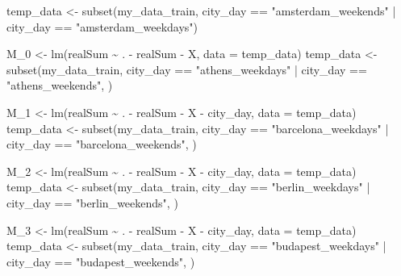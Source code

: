 \documentclass[
]{article}
\newenvironment{Shaded}{\begin{snugshade}}{\end{snugshade}}
\newcommand{\AttributeTok}[1]{\textcolor[rgb]{0.77,0.63,0.00}{#1}}
\newcommand{\FunctionTok}[1]{\textcolor[rgb]{0.00,0.00,0.00}{#1}}
\newcommand{\NormalTok}[1]{#1}
\newcommand{\OtherTok}[1]{\textcolor[rgb]{0.56,0.35,0.01}{#1}}
\newcommand{\SpecialCharTok}[1]{\textcolor[rgb]{0.00,0.00,0.00}{#1}}
\newcommand{\StringTok}[1]{\textcolor[rgb]{0.31,0.60,0.02}{#1}}
\begin{document}
\begin{Shaded}
\begin{Highlighting}[]
\NormalTok{temp\_data }\OtherTok{\textless{}{-}} \FunctionTok{subset}\NormalTok{(my\_data\_train, city\_day }\SpecialCharTok{==} \StringTok{"amsterdam\_weekends"} \SpecialCharTok{|}
\NormalTok{    city\_day }\SpecialCharTok{==} \StringTok{"amsterdam\_weekdays"}\NormalTok{)}

\NormalTok{M\_0 }\OtherTok{\textless{}{-}} \FunctionTok{lm}\NormalTok{(realSum }\SpecialCharTok{\textasciitilde{}}\NormalTok{ . }\SpecialCharTok{{-}}\NormalTok{ realSum }\SpecialCharTok{{-}}\NormalTok{ X, }\AttributeTok{data =}\NormalTok{ temp\_data)}
\NormalTok{temp\_data }\OtherTok{\textless{}{-}} \FunctionTok{subset}\NormalTok{(my\_data\_train, city\_day }\SpecialCharTok{==} \StringTok{"athens\_weekdays"} \SpecialCharTok{|}
\NormalTok{    city\_day }\SpecialCharTok{==} \StringTok{"athens\_weekends"}\NormalTok{, )}

\NormalTok{M\_1 }\OtherTok{\textless{}{-}} \FunctionTok{lm}\NormalTok{(realSum }\SpecialCharTok{\textasciitilde{}}\NormalTok{ . }\SpecialCharTok{{-}}\NormalTok{ realSum }\SpecialCharTok{{-}}\NormalTok{ X }\SpecialCharTok{{-}}\NormalTok{ city\_day, }\AttributeTok{data =}\NormalTok{ temp\_data)}
\NormalTok{temp\_data }\OtherTok{\textless{}{-}} \FunctionTok{subset}\NormalTok{(my\_data\_train, city\_day }\SpecialCharTok{==} \StringTok{"barcelona\_weekdays"} \SpecialCharTok{|}
\NormalTok{    city\_day }\SpecialCharTok{==} \StringTok{"barcelona\_weekends"}\NormalTok{, )}

\NormalTok{M\_2 }\OtherTok{\textless{}{-}} \FunctionTok{lm}\NormalTok{(realSum }\SpecialCharTok{\textasciitilde{}}\NormalTok{ . }\SpecialCharTok{{-}}\NormalTok{ realSum }\SpecialCharTok{{-}}\NormalTok{ X }\SpecialCharTok{{-}}\NormalTok{ city\_day, }\AttributeTok{data =}\NormalTok{ temp\_data)}
\NormalTok{temp\_data }\OtherTok{\textless{}{-}} \FunctionTok{subset}\NormalTok{(my\_data\_train, city\_day }\SpecialCharTok{==} \StringTok{"berlin\_weekdays"} \SpecialCharTok{|}
\NormalTok{    city\_day }\SpecialCharTok{==} \StringTok{"berlin\_weekends"}\NormalTok{, )}

\NormalTok{M\_3 }\OtherTok{\textless{}{-}} \FunctionTok{lm}\NormalTok{(realSum }\SpecialCharTok{\textasciitilde{}}\NormalTok{ . }\SpecialCharTok{{-}}\NormalTok{ realSum }\SpecialCharTok{{-}}\NormalTok{ X }\SpecialCharTok{{-}}\NormalTok{ city\_day, }\AttributeTok{data =}\NormalTok{ temp\_data)}
\NormalTok{temp\_data }\OtherTok{\textless{}{-}} \FunctionTok{subset}\NormalTok{(my\_data\_train, city\_day }\SpecialCharTok{==} \StringTok{"budapest\_weekdays"} \SpecialCharTok{|}
\NormalTok{    city\_day }\SpecialCharTok{==} \StringTok{"budapest\_weekends"}\NormalTok{, )}


\end{Highlighting}
\end{Shaded}
\end{document}
